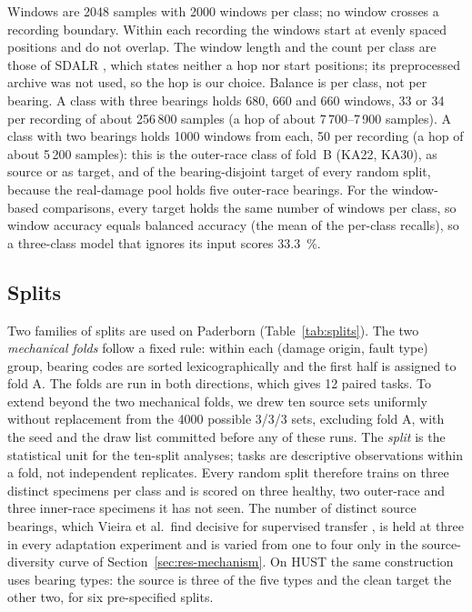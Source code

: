 Windows are 2048 samples with 2000 windows per class; no window crosses a recording boundary. Within each recording the
windows start at evenly spaced positions and do not overlap. The window length and the count per class are those of SDALR
\cite{sdalr2025}, which states neither a hop nor start positions; its preprocessed archive was not used, so the hop is our
choice. Balance is per class, not per bearing. A class with three bearings holds 680, 660 and 660 windows, 33 or 34 per
recording of about 256\,800 samples (a hop of about 7\,700--7\,900 samples). A class with two bearings holds 1000 windows
from each, 50 per recording (a hop of about 5\,200 samples): this is the outer-race class of fold~B (KA22, KA30), as source
or as target, and of the bearing-disjoint target of every random split, because the real-damage pool holds five outer-race
bearings. For the window-based comparisons, every target holds the same number of
windows per class, so window accuracy equals balanced accuracy (the mean of the per-class recalls), so a three-class model
that ignores its input scores \SI{33.3}{\percent}.

\subsection{Splits}



Two families of splits are used on Paderborn (Table~\ref{tab:splits}). The two \emph{mechanical folds} follow a fixed rule:
within each (damage origin, fault type) group, bearing codes are sorted lexicographically and the first half is assigned to
fold A. The folds are run in both directions, which gives 12 paired tasks. To extend beyond the two mechanical folds, we drew ten source sets uniformly without replacement from the 4000 possible
3/3/3 sets, excluding fold A, with the seed
and the draw list committed before any of these runs. The \emph{split} is the statistical unit for the ten-split analyses;
tasks are descriptive observations within a fold, not independent replicates. Every random split therefore trains on three
distinct specimens per class and is scored on three healthy, two outer-race and three inner-race specimens it has not seen.
The number of distinct source bearings, which Vieira et al.\ find decisive for supervised transfer \cite{vieira2026}, is
held at three in every adaptation experiment and is varied from one to four only in the source-diversity curve of
Section~\ref{sec:res-mechanism}. On HUST the same construction uses bearing types: the source is three of the five types
and the clean target the other two, for six pre-specified splits.

